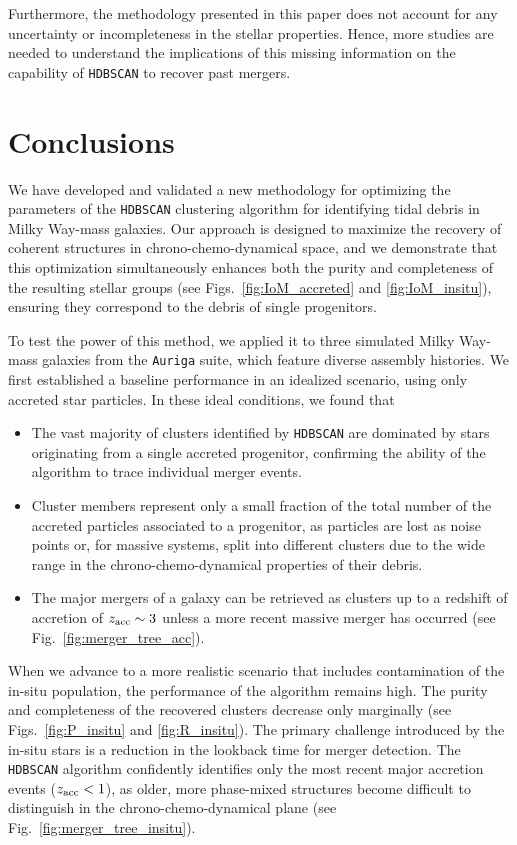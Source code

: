 Furthermore, the methodology presented in this paper does not account for any uncertainty or incompleteness in the stellar properties. Hence, more studies are needed to understand the implications of this missing information on the capability of \texttt{HDBSCAN} to recover past mergers.

\section{Conclusions}
\label{sec:concl}

We have developed and validated a new methodology for optimizing the parameters of the \texttt{HDBSCAN} clustering algorithm for identifying tidal debris in Milky Way-mass galaxies. Our approach is designed to maximize the recovery of coherent structures in chrono-chemo-dynamical space, and we demonstrate that this optimization simultaneously enhances both the purity and completeness of the resulting stellar groups (see Figs.~\ref{fig:IoM_accreted} and \ref{fig:IoM_insitu}), ensuring they correspond to the debris of single progenitors.

To test the power of this method, we applied it to three simulated Milky Way-mass galaxies from the \texttt{Auriga} suite, which feature diverse assembly histories. We first established a baseline performance in an idealized scenario, using only accreted star particles. In these ideal conditions, we found that

\begin{itemize}
    \item The vast majority of clusters identified by \texttt{HDBSCAN} are dominated by stars originating from a single accreted progenitor, confirming the ability of the algorithm to trace individual merger events.
    \item Cluster members represent only a small fraction of the total number of the accreted particles associated to a progenitor, as particles are lost as noise points or, for massive systems, split into different clusters due to the wide range in the chrono-chemo-dynamical properties of their debris.
    \item The major mergers of a galaxy can be retrieved as clusters up to a redshift of accretion of $z_{\rm acc}\sim3$ unless a more recent massive merger has occurred (see Fig.~\ref{fig:merger_tree_acc}). 
\end{itemize}

When we advance to a more realistic scenario that includes contamination of the in-situ population, the performance of the algorithm remains high. The purity and completeness of the recovered clusters decrease only marginally (see Figs.~\ref{fig:P_insitu} and \ref{fig:R_insitu}). The primary challenge introduced by the in-situ stars is a reduction in the lookback time for merger detection. The \texttt{HDBSCAN} algorithm confidently identifies only the most recent major accretion events ($z_{\rm acc}<1$), as older, more phase-mixed structures become difficult to distinguish in the chrono-chemo-dynamical plane (see Fig.~\ref{fig:merger_tree_insitu}).

